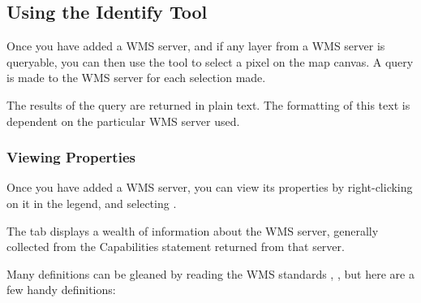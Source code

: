 %
%
\subsection{Using the Identify Tool}\label{sec:ogc-wms-identify}

Once you have added a WMS server,
and if any layer from a WMS server is queryable, you can then use
the  tool to select a pixel on the map canvas.
A query is made to the WMS server for each selection made.

The results of the query are returned in plain text.
The formatting of this text is dependent on the particular
WMS server used.

\subsubsection{Viewing Properties}\label{sec:ogc-wms-properties}

Once you have added a WMS server, you can view its properties
by right-clicking on it in the legend, and selecting
.


\label{sec:ogc-wms-properties-metadata}

The  tab displays a wealth of information about the WMS server,
generally collected from the Capabilities statement returned from
that server.

Many definitions can be gleaned by reading the WMS
standards \cite{OGCWMS010101web}, \cite{OGCWMS010300web}, but
here are a few handy definitions:

